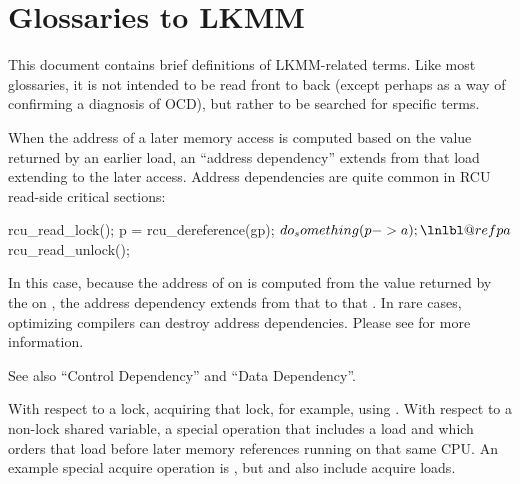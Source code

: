 \section{Glossaries to LKMM}

This document contains brief definitions of LKMM-related terms.
Like most glossaries, it is not intended to be read front to back
(except perhaps as a way of confirming a diagnosis of OCD), but rather
to be searched for specific terms.

\begin{description}[style=nextline]
  \item[Address Dependency:]
	When the address of a later memory access is computed
	based on the value returned by an earlier load, an ``address
	dependency'' extends from that load extending to the later access.
	Address dependencies are quite common in RCU read-side critical
	sections:

\begin{fcvlabel}
\begin{VerbatimN}[commandchars=\\\@\$]
	rcu_read_lock();
	p = rcu_dereference(gp);    \lnlbl@rcuderef$
	do_something(p->a);    \lnlbl@refpa$
	rcu_read_unlock();
\end{VerbatimN}
\end{fcvlabel}
        
	\begin{fcvref}
	In this case, because the address of  on 
	is computed from the value returned by the 
	on , the address dependency extends from that
	 to that .
	In rare cases, optimizing compilers can destroy address dependencies.
	Please see 
	for more information.
        \end{fcvref}

	See also ``Control Dependency'' and ``Data Dependency''.

      \item[Acquire:]
	With respect to a lock, acquiring that lock, for example,
	using .
	With respect to a non-lock shared variable, a special operation
	that includes a load and which orders that load before later memory
	references running on that same CPU.
	An example special acquire operation is ,
	but  and 
	also include acquire loads.


\end{description}
